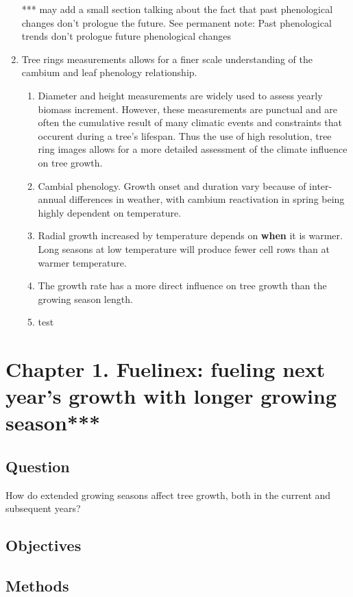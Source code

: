 \documentclass{article}
\begin{document}
\begin{enumerate}
*** may add a small section talking about the fact that past phenological changes don't prologue the future. See permanent note: Past phenological trends don't prologue future phenological changes

\item Tree rings measurements allows for a finer scale understanding of the cambium and leaf phenology relationship.
\begin{enumerate}
\item  Diameter and height measurements are widely used to assess yearly biomass increment. However, these measurements are punctual and are often the cumulative result of many climatic events and constraints that occurent during a tree's lifespan. Thus the use of high resolution, tree ring images allows for a more detailed assessment of the climate influence on tree growth.
\item Cambial phenology. Growth onset and duration vary because of inter-annual differences in weather, with cambium reactivation in spring being highly dependent on temperature. 
\item Radial growth increased by temperature depends on \textbf{when} it is warmer. Long seasons at low temperature will produce fewer cell rows than at warmer temperature. 
\item The growth rate has a more direct influence on tree growth than the growing season length. 
\item test
\end{enumerate}

\end{enumerate}

\section*{Chapter 1. Fuelinex: fueling next year's growth with longer growing season*** }
\subsection* {Question}
How do extended growing seasons affect tree growth, both in the current and subsequent years? 
\subsection* {Objectives}
\subsection* {Methods}
\end{document}
